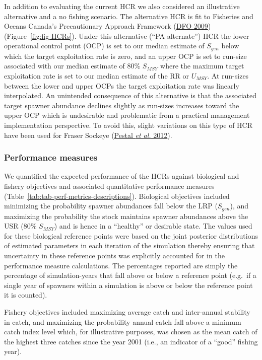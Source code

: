 \documentclass[french,11pt]{book}
\begin{document}
In addition to evaluating the current HCR we also considered an illustrative alternative and a no fishing scenario. The alternative HCR is fit to Fisheries and Oceans Canada's Precautionary Approach Framework (\protect\hyperlink{ref-dfoFisheryDecisionmakingFramework2009}{DFO 2009}) (Figure~\ref{fig:fig-HCRs}). Under this alternative (``PA alternate'') HCR the lower operational control point (OCP) is set to our median estimate of \(S_{gen}\) below which the target exploitation rate is zero, and an upper OCP is set to run-size associated with our median estimate of 80\% \(S_{MSY}\) where the maximum target exploitation rate is set to our median estimate of the RR or \(U_{MSY}\). At run-sizes between the lower and upper OCPs the target exploitation rate was linearly interpolated. An unintended consequence of this alternative is that the associated target spawner abundance declines slightly as run-sizes increases toward the upper OCP which is undesirable and problematic from a practical management implementation perspective. To avoid this, slight variations on this type of HCR have been used for Fraser Sockeye (\protect\hyperlink{ref-pestalUpdatedMethodsAssessing2012}{Pestal \emph{et al.} 2012}).

\hypertarget{performance-measures}{%
\subsubsection{Performance measures}\label{performance-measures}}

We quantified the expected performance of the HCRs against biological and fishery objectives and associated quantitative performance measures (Table~\ref{tab:tab-perf-metrics-descriptions}). Biological objectives included minimizing the probability spawner abundances fall below the LRP (\(S_{gen}\)), and maximizing the probability the stock maintains spawner abundances above the USR (80\% \(S_{MSY}\)) and is hence in a ``healthy'' or desirable state. The values used for these biological reference points were based on the joint posterior distributions of estimated parameters in each iteration of the simulation thereby ensuring that uncertainty in these reference points was explicitly accounted for in the performance measure calculations. The percentages reported are simply the percentage of simulation-years that fall above or below a reference point (e.g.~if a single year of spawners within a simulation is above or below the reference point it is counted).

Fishery objectives included maximizing average catch and inter-annual stability in catch, and maximizing the probability annual catch fall above a minimum catch index level which, for illustrative purposes, was chosen as the mean catch of the highest three catches since the year 2001 (i.e., an indicator of a ``good'' fishing year).
\end{document}
